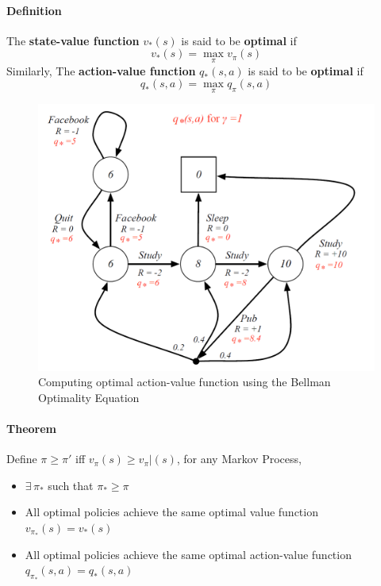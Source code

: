 	\paragraph{Definition} The \textbf{ state-value function} $v_*(s)$ is said to be \textbf{optimal} if 
	\begin{equation*}
	v_*(s) = \max_\pi v_\pi (s)
	\end{equation*}
	Similarly, The \textbf{ action-value function} $q_*(s,a)$ is said to be \textbf{optimal} if 
	\begin{equation*}
	q_*(s,a) = \max_\pi q_\pi (s,a)
	\end{equation*}


	\begin{figure}[h]
	\centering
	\includegraphics[scale=0.5]{ch2fig5.png}
	\caption{Computing optimal action-value function using the Bellman Optimality Equation}
	\end{figure}

	\paragraph*{Theorem}
	Define $\pi \ge \pi'$ iff $v_\pi(s) \ge v_{\pi}|(s)$, for any Markov Process,
	\begin{itemize}
	\item $\exists \, \pi_*$ such that $\pi_* \ge \pi$
	\item All optimal policies achieve the same optimal value function $v_{\pi_*}(s) = v_*(s)$
	\item All optimal policies achieve the same optimal action-value function $q_{\pi_*}(s,a) = q_*(s,a)$
	\end{itemize}


